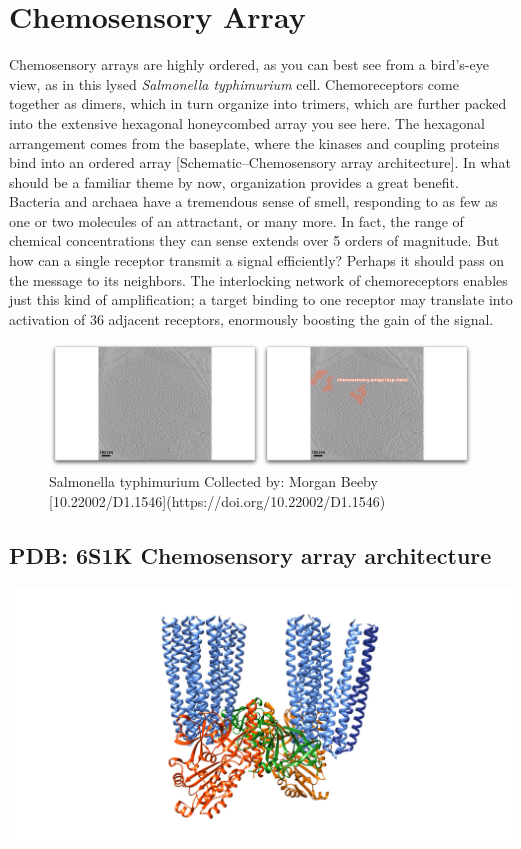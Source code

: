 \documentclass[]{tufte-book}
\begin{document}
\section{Chemosensory Array}\label{chemosensory-array}

Chemosensory arrays are highly ordered, as you can best see from a
bird's-eye view, as in this lysed \emph{Salmonella typhimurium} cell.
Chemoreceptors come together as dimers, which in turn organize into
trimers, which are further packed into the extensive hexagonal
honeycombed array you see here. The hexagonal arrangement comes from the
baseplate, where the kinases and coupling proteins bind into an ordered
array {[}Schematic--Chemosensory array architecture{]}. In what should
be a familiar theme by now, organization provides a great benefit.
Bacteria and archaea have a tremendous sense of smell, responding to as
few as one or two molecules of an attractant, or many more. In fact, the
range of chemical concentrations they can sense extends over 5 orders of
magnitude. But how can a single receptor transmit a signal efficiently?
Perhaps it should pass on the message to its neighbors. The interlocking
network of chemoreceptors enables just this kind of amplification; a
target binding to one receptor may translate into activation of 36
adjacent receptors, enormously boosting the gain of the signal.

\begin{figure}
\includegraphics{movie_stills/7_2} \caption[Salmonella typhimurium Collected by]{Salmonella typhimurium Collected by: Morgan Beeby [10.22002/D1.1546](https://doi.org/10.22002/D1.1546)}\label{fig:unnamed-chunk-124}
\end{figure}

\subsection{PDB: 6S1K Chemosensory array
architecture}\label{PDB:_6S1K_Chemosensory_array_architecture}

\includegraphics{img/schematics/7_2_1}
\end{document}
